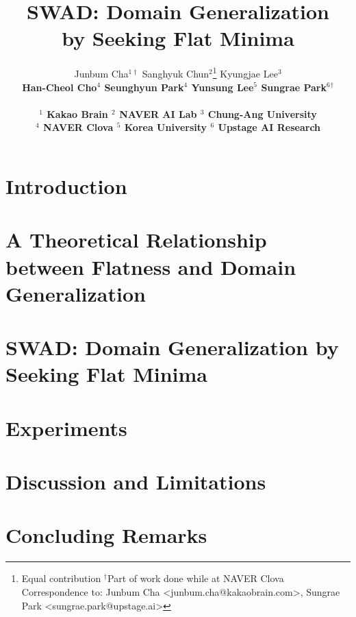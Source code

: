 \documentclass{article}
\title{SWAD: Domain Generalization\\by Seeking Flat Minima}
\author{%
    Junbum Cha$^{1\dagger}$ \qquad Sanghyuk Chun$^{2}$\thanks{Equal contribution \quad $^\dagger$Part of work done while at NAVER Clova \newline
    \hspace*{0.0cm}Correspondence to: Junbum Cha <junbum.cha@kakaobrain.com>, Sungrae Park <sungrae.park@upstage.ai>
    } \qquad Kyungjae Lee$^3$\footnotemark[1] \\
    \bf Han-Cheol Cho$^4$ \quad Seunghyun Park$^4$ \quad Yunsung Lee$^5$ \quad Sungrae Park$^6$$^\dagger$\\\\
  $^1$ Kakao Brain \quad $^2$ NAVER AI Lab \quad $^3$ Chung-Ang University \\
   $^4$ NAVER Clova \quad $^5$ Korea University \quad $^6$ Upstage AI Research
    
}
\begin{document}
\maketitle



\vspace{-.4em}
\section{Introduction}
\vspace{-.25em}
\label{s_introduction}


\vspace{-.25em}
\section{A Theoretical Relationship between Flatness and Domain Generalization}
\label{s_theoretical_analysis}
\vspace{-.25em}


\section{SWAD: Domain Generalization by Seeking Flat Minima}
\label{s_method}


\section{Experiments}
\label{s_empirical_results}



% 

\section{Discussion and Limitations}
\label{s_discussion}


\section{Concluding Remarks}
\label{s_conclusion}

\end{document}

